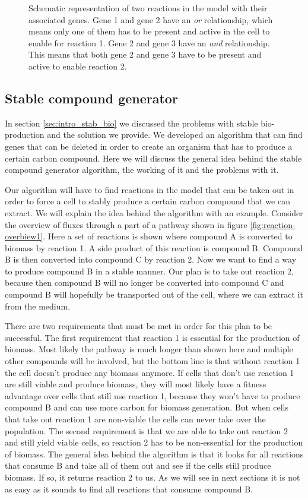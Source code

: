 \documentclass[12pt]{report}
\begin{document}
\begin{figure}[hbtp]
  \centering
     
      \caption{Schematic representation of two reactions in the model with their associated genes. Gene 1 and gene 2 have an \emph{or} relationship, which means only one of them has to be present and active in the cell to enable for reaction 1. Gene 2 and gene 3 have an \emph{and} relationship. This means that both gene 2 and gene 3 have to be present and active to enable reaction 2.}
  \label{fig:genes1}
\end{figure}



\subsection{Stable compound generator}
In section \ref{sec:intro_stab_bio} we discussed the problems with stable bio-production and the solution we provide. We developed an algorithm that can find genes that can be deleted in order to create an organism that has to produce a certain carbon compound.  Here we will discuss the general idea behind the stable compound generator algorithm, the working of it and the problems with it.

Our algorithm will have to find reactions in the model that can be taken out in order to force a cell to stably produce a certain carbon compound that we can extract.
We will explain the idea behind the algorithm with an example. Consider the overview of fluxes through a part of a pathway shown in figure \ref{fig:reaction-overbiew1}. Here a set of reactions is shown where compound A is converted to biomass by reaction 1. A side product of this reaction is compound B. Compound B is then converted into compound C by reaction 2.
Now we want to find a way to produce compound B in a stable manner. Our plan is to take out reaction 2, because then compound B will no longer be converted into compound C and compound B will hopefully be transported out of the cell, where we can extract it from the medium.

There are two requirements that must be met in order for this plan to be successful.
The first requirement that reaction 1 is essential for the production of biomass. Most likely the pathway is much longer than shown here and multiple other compounds will be involved, but the bottom line is that without reaction 1 the cell doesn't produce any biomass anymore. If cells that don't use reaction 1 are still viable and produce biomass, they will most likely have a fitness advantage over cells that still use reaction 1, because they won't have to produce compound B and can use more carbon for biomass generation. But when cells that take out reaction 1 are non-viable the cells can never take over the population.
The second requirement is that we are able to take out reaction 2 and still yield viable cells, so reaction 2 has to be non-essential for the production of biomass. The general idea behind the algorithm is that it looks for all reactions that consume B and take all of them out and see if the cells still produce biomass. If so, it returns reaction 2 to us. As we will see in next sections it is not as easy as it sounds to find all reactions that consume compound B.
\end{document}
